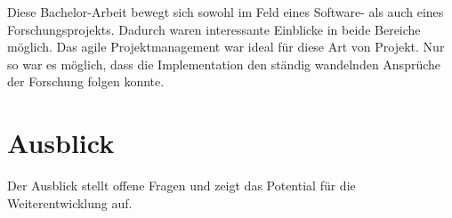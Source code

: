 Diese Bachelor-Arbeit bewegt sich sowohl im Feld eines Software- als auch eines Forschungsprojekts. Dadurch waren interessante Einblicke in beide Bereiche möglich. Das agile Projektmanagement war ideal für diese Art von Projekt. Nur so war es möglich, dass die Implementation den ständig wandelnden Ansprüche der Forschung folgen konnte.





\section{Ausblick}

Der Ausblick stellt offene Fragen und zeigt das Potential für die Weiterentwicklung auf. 

